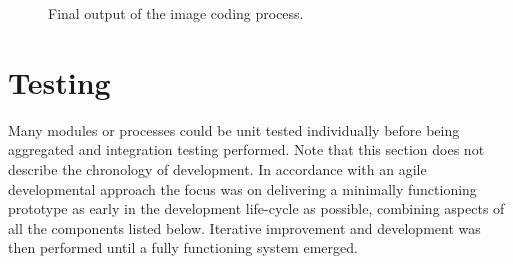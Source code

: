     
\begin{figure}[htp]
  \begin{center}
  \end{center}
  \caption{Final output of the image coding process.}
  \label{scn:images}
\end{figure}
    

\FloatBarrier
\section{Testing}

Many modules or processes could be unit tested individually before being aggregated and integration testing performed. Note that this section does not describe the chronology of development. In accordance with an agile developmental approach the focus was on delivering a minimally functioning prototype as early in the development life-cycle as possible, combining aspects of all the components listed below. Iterative improvement and development was then performed until a fully functioning system emerged.


